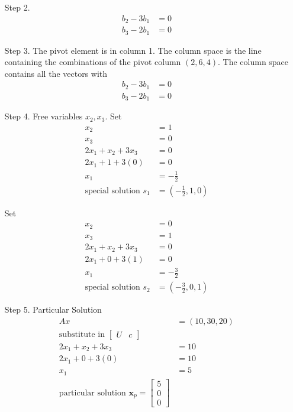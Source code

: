 \documentclass[main.tex]{subfiles}
\begin{document}
\begin{enumerate}
\begin{enumerate}
        \item[Step 2.]
        $$
        \begin{aligned}
        b_{2}-3 b_{1} &= 0 \\
        b_{3}-2 b_{1} &= 0
        \end{aligned}
        $$
        
        \item[Step 3.]
        The pivot element is in column 1. The column space is the line containing the combinations of the pivot column $(2,6,4)$. The column space contains all the vectors with 
        $$
        \begin{aligned}
        b_{2}-3 b_{1} &=0 \\
        b_{3}-2 b_{1} &=0
        \end{aligned}
        $$
        
        \item[Step 4.]
        Free variables $x_{2}, x_{3}$. Set
        $$
        \begin{aligned}
        x_{2} &= 1 \\
        x_{3} &= 0 \\
        2 x_{1}+x_{2}+3 x_{3} &= 0 \\
        2 x_{1}+1+3(0) &= 0\\
        x_{1} &= -\frac{1}{2}\\
        \text{special solution }s_{1} &= \left(-\frac{1}{2}, 1,0\right)
        \end{aligned}
        $$
        
        Set
        $$
        \begin{aligned}
        x_{2} &= 0 \\
        x_{3} &= 1 \\
        2 x_{1}+x_{2}+3 x_{3} &= 0 \\
        2 x_{1}+0+3(1) &= 0\\
        x_{1} &= -\frac{3}{2}\\
        \text{special solution }s_{2} &= \left(-\frac{3}{2},0,1\right)
        \end{aligned}
        $$
        
        \item[Step 5.] Particular Solution
        $$
        \begin{aligned}
        A x &= (10,30,20)\\
        \text{substitute in }\left[\begin{array}{ll}
        U & c
        \end{array}\right]\\
        2 x_{1}+x_{2}+3 x_{3} &=10 \\
        2 x_{1}+0+3(0) &=10 \\
        x_{1} &=5\\
        \text{particular solution } \bm{x}_{p}=\left[\begin{array}{l}
        5 \\
        0 \\
        0
        \end{array}\right]
        \end{aligned}
        $$
        

\end{enumerate}
\end{enumerate}
\end{document}
